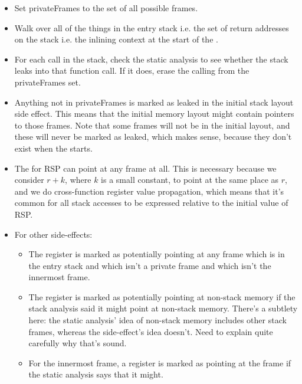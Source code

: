 
\begin{itemize}
\item
  Set privateFrames to the set of all possible frames.
\item
  Walk over all of the things in the entry stack i.e. the set of
  return addresses on the stack i.e. the inlining context at the start
  of the {\StateMachine}.
\item
  For each call in the stack, check the static analysis to see whether
  the stack leaks into that function call.  If it does, erase the
  calling from the privateFrames set.
\item
  Anything not in privateFrames is marked as leaked in the initial
  stack layout side effect.  This means that the initial memory layout
  might contain pointers to those frames.  Note that some frames will
  not be in the initial layout, and these will never be marked as
  leaked, which makes sense, because they don't exist when the
  {\StateMachine} starts.
\item
  The  for RSP can point at any frame at
  all.  This is necessary because we consider $r+k$, where $k$ is a
  small constant, to point at the same place as $r$, and we do
  cross-function register value propagation, which means that it's
  common for all stack accesses to be expressed relative to the
  initial value of RSP.
\item
  For other  side-effects:

  \begin{itemize}
  \item The register is marked as potentially pointing at any frame
    which is in the entry stack and which isn't a private frame and
    which isn't the innermost frame.
  \item The register is marked as potentially pointing at non-stack
    memory if the stack analysis said it might point at non-stack
    memory.  There's a subtlety here: the static analysis' idea of
    non-stack memory includes other stack frames, whereas the
    side-effect's idea doesn't.  Need to explain quite carefully why
    that's sound.
  \item For the innermost frame, a register is marked as pointing at
    the frame if the static analysis says that it might.
  \end{itemize}
\end{itemize}


